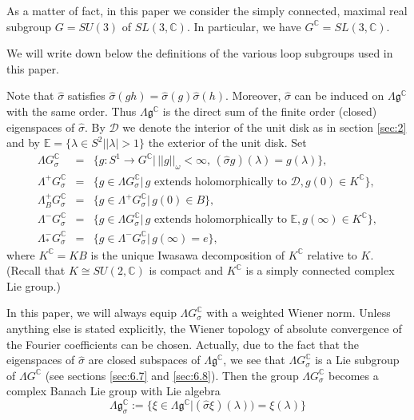 \documentclass[a4paper,11pt]{amsart}
\theoremstyle{definition}
\numberwithin{equation}{section}
\newcommand{\C}{\mathbb{C}}
\newcommand{\E}{\mathbb{E}}
\begin{document}
As a  matter of fact, in this paper we consider the simply connected, maximal  real subgroup 
$G = SU(3)$ of $SL(3, \C).$ In particular, we have $G^\C = SL(3, \C).$
 

We will write down below the definitions of the various loop subgroups used in this paper.

Note that $\hat{\sigma}$ satisfies $\hat{\sigma}(gh)=\hat{\sigma}(g)\hat{\sigma}(h)$. Moreover, $\hat{\sigma}$ can be induced on $\Lambda \mathfrak{g}^{\C}$ with  the same order.
Thus $\Lambda \mathfrak{g}^{\C}$ is the direct sum of the finite order (closed) eigenspaces of $\hat{\sigma}$. 
By $\mathcal{D}$ we
denote the interior of the unit disk  as in section \ref{sec:2} and by $\E=\{\lambda\in S^2 | |\lambda|>1\}$  the exterior of the unit disk. 
Set 
\begin{eqnarray*}
 \Lambda G_{\sigma}^{\mathbb C}&=&\{ g: S^1\rightarrow G^{\C} | \, ||g||_{\omega}<\infty, \, (\hat{\sigma} g)(\lambda)=g(\lambda) \},\\
\Lambda^{+} G^{\mathbb C}_{\sigma}&=&\{g\in \Lambda G^{\mathbb{C}}_{\sigma} | \, g \text{ extends holomorphically to } \mathcal{D}, g(0)\in K^{\mathbb C}\},\\
\Lambda^{+}_B G_{\sigma}^{\mathbb C}&=&\{ g\in \Lambda^{+} G_{\sigma}^{\mathbb C} |\, 
g(0)\in B \},\\
\Lambda^{-} G^{\mathbb C}_{\sigma}&=&\{ g\in \Lambda G^{\mathbb{C}}_{\sigma} | \, g \text{ extends holomorphically to } \mathbb{E}, g(\infty)\in K^{\mathbb C}\},\\
\Lambda^{-}_{*} G^{\mathbb C}_{\sigma}&=&\{ g\in \Lambda^{-} G^{\mathbb C}_{\sigma} | \, g(\infty)=e\},
\end{eqnarray*}
where $K^{\mathbb C} = KB$ is the unique Iwasawa decomposition of $K^{\mathbb C}$ relative to $K$.
(Recall that $K \cong SU(2, \C)$ is compact and  $K^\C$ is a simply connected complex Lie group.)


In this paper, we will always equip $\Lambda G_{\sigma}^{\mathbb C}$ with a weighted Wiener norm.
Unless anything else is stated explicitly, the Wiener topology of absolute convergence of the Fourier coefficients can be chosen.
Actually, due to the fact that the eigenspaces of $\hat{\sigma}$ are closed subspaces of $\Lambda\mathfrak{g}^{\C}$, we see that $\Lambda G_{\sigma}^{\mathbb C}$ is a Lie subgroup of $\Lambda G^{\C}$
(see sections \ref{sec:6.7} and \ref{sec:6.8}). 
Then the group
$\Lambda G^{\mathbb C}_{\sigma}$ becomes a complex Banach Lie group  with Lie algebra
\begin{equation*}
 \Lambda \mathfrak{g}^{\mathbb{C}}_{\sigma}:=\{\xi \in   \Lambda \mathfrak{g}^{\mathbb{C}}|
  (\hat{\sigma}\xi)(\lambda))=\xi(\lambda)\}
\end{equation*}
\end{document}
